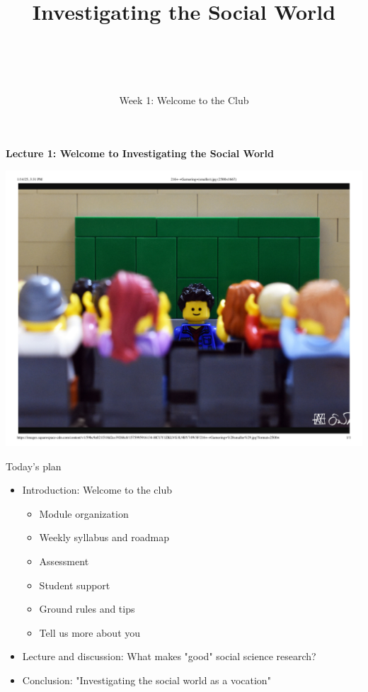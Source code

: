 \documentclass[
  10pt,
  ignorenonframetext,
]{beamer}
\title{\hfill\break
\hfill\break
Investigating the Social World\\
\strut \\}
\author{Week 1: Welcome to the Club\\}
\date{}
\begin{document}
\frame{\titlepage}

\begin{frame}
\begin{center}
\textbf{Lecture 1: Welcome to Investigating the Social World}
\end{center}
\vspace{0.7cm}

\begin{center}\includegraphics[width=0.7\linewidth]{Figs/cover} \end{center}
\end{frame}

\begin{frame}{Today's plan}
\protect\hypertarget{todays-plan}{}
\begin{itemize}
  \item Introduction: Welcome to the club
  \vspace{0.1cm}
    \begin{itemize}
    \item Module organization
    \item Weekly syllabus and roadmap
    \item Assessment
    \item Student support
    \item Ground rules and tips
    \item Tell us more about you
    \end{itemize}
  \vspace{0.3cm}
  \item Lecture and discussion: What makes "good" social science research?
  \vspace{0.3cm}
  \item Conclusion: "Investigating the social world as a vocation"
\end{itemize}
\end{frame}
\end{document}

